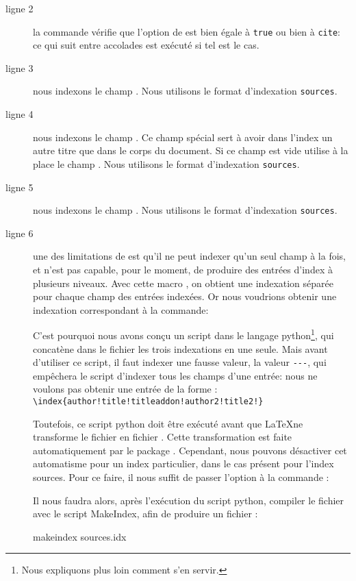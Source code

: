\begin{description}
\item[ligne 2] la commande  vérifie que l'option  de  est bien égale à \verb|true| ou bien à \verb|cite|: ce qui suit entre accolades est exécuté si tel est le cas.
\item[ligne 3] nous indexons le champ .  Nous utilisons le format d'indexation \verb|sources|.
\item[ligne 4] nous indexons le champ . Ce champ spécial  sert à avoir dans l'index un autre titre que dans le corps du document. Si ce champ est vide  utilise à la place le champ . Nous utilisons le format d'indexation \verb|sources|.
\item[ligne 5] nous indexons le champ . Nous utilisons le format d'indexation \verb|sources|.
\item[ligne 6]  une des limitations de  est qu'il ne peut indexer qu'un seul champ à la fois, et n'est pas capable, pour le moment, de produire des entrées d'index à plusieurs niveaux. 
Avec cette macro , on obtient une indexation séparée pour chaque champ des entrées indexées. 
Or nous voudrions obtenir une indexation correspondant à la commande:
\begin{latexcode} 
\end{latexcode}
 C'est pourquoi nous avons conçu un script dans le langage python\footnote{Nous expliquons plus loin comment s'en servir.}, qui concatène dans le fichier  les trois indexations en une seule.
Mais avant d'utiliser ce script, il faut  indexer une fausse valeur, la valeur \verb|---|, qui empêchera le script d'indexer tous les champs d'une entrée: nous ne voulons pas obtenir une entrée de la forme : \\
 \verb|\index{author!title!titleaddon!author2!title2!}|
 
Toutefois, ce script python doit être exécuté avant que \LaTeX ne transforme le fichier  en fichier . Cette transformation est faite automatiquement par le package . Cependant, nous pouvons désactiver cet automatisme pour un index particulier, dans le cas présent pour l'index sources. Pour ce faire, il nous suffit de passer l'option  à la commande  :\label{noautomatic}

\begin{latexcode}
\makeindex[name=sources,title=Index des sources,noautomatic]
\end{latexcode}

Il nous faudra alors, après l'exécution du script python, compiler le fichier  avec le script MakeIndex, afin de produire un fichier  :
\begin{bashcode}
makeindex sources.idx
\end{bashcode}
\end{description}

